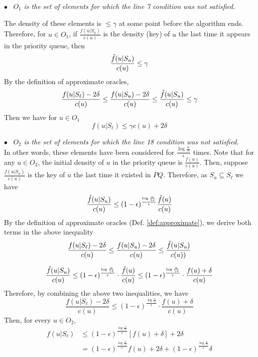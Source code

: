 \documentclass[10pt]{article} %
\theoremstyle{remark}
\newcommand{\OPT}{{\rm OPT}}
\begin{document}
     $\bullet$~ \textit{$O_1$ is the set of elements for which the line 7 condition was not satisfied.\ }
     
     The density of these elements is $\leq \gamma$ at some point before the algorithm ends. Therefore, for $u \in O_1$, if $\frac{f(u|S_u)}{c(u)}$ is the density (key) of $u$ the last time it appears in the priority queue, then 
     \[ \frac{\Tilde{f}(u|S_u)}{c(u)} \leq \gamma\]
     By the definition of approximate oracles,
     \[ \frac{f(u|S_\ell) - 2\delta}{c(u)} \leq \frac{f(u|S_u) - 2\delta}{c(u)} \leq \frac{\Tilde{f}(u|S_u)}{c(u)} \leq \gamma \]
     Then we have for $u \in O_1$
    \begin{equation}
        \label{eq:o1-approx}
     f(u|S_\ell) \leq \gamma c(u) + 2\delta       
    \end{equation}
        
    
    $\bullet$~ \textit{$O_2$ is the set of elements for which the line 18 condition was not satisfied.\ }\\
    In other words, these elements  have been considered for $\frac{\log \frac{n}{\gamma\epsilon}}{\epsilon} $ times. Note that for any $u \in O_2$, the initial density of $u$ in the priority queue is $\frac{f(u)}{c(u)}$. Then, suppose $\frac{f(u|S_u)}{c(u)}$ is the key of $u$ the last time it existed in $PQ$. Therefore, as $S_u \subseteq S_\ell$ we have 
    \[\frac{\Tilde{f}(u|S_u)}{c(u)} \leq (1-\epsilon)^{\frac{\log \frac{n}{\gamma \epsilon}}{\epsilon}}  \frac{\Tilde{f}(u)}{c(u)}\]
    By the definition of approximate oracles (Def. \ref{def:approximate}), we derive both terms in the above inequality
    \[\frac{f(u|S_\ell)-2\delta}{c(u)} \leq \frac{f(u|S_u)-2\delta}{c(u)} \leq \frac{\Tilde{f}(u|S_u)}{c(u))} \]
    
    \[\frac{\Tilde{f}(u|S_u)}{c(u)} \leq (1-\epsilon)^{\frac{\log \frac{n}{\gamma \epsilon}}{\epsilon}} \cdot \frac{\Tilde{f}(u)}{c(u)} \leq  (1-\epsilon)^{\frac{\log \frac{n}{\gamma \epsilon}}{\epsilon}} \cdot \frac{f(u)+\delta}{c(u)}\]
    Therefore, by combining the above two inequalities, we have
    \begin{equation*}
        \frac{f(u|S_\ell)-2\delta}{c(u)} \leq (1-\epsilon)^{\frac{\log \frac{n}{\gamma \epsilon}}{\epsilon}} \cdot \frac{f(u)+\delta}{c(u)}
    \end{equation*}
    Then, for every $u \in O_2$,
    \begin{align}
        f(u|S_\ell) &\leq (1-\epsilon)^{\frac{\log \frac{n}{\gamma \epsilon}}{\epsilon}} [ f(u) + \delta ] + 2\delta \nonumber\\
        & = (1-\epsilon)^{\frac{\log \frac{n}{\gamma \epsilon}}{\epsilon}} f(u) + 2\delta +  (1-\epsilon)^{\frac{\log \frac{n}{\gamma \epsilon}}{\epsilon}} \delta
        \label{eq:o2-approx}
    \end{align}
    
\end{document}
